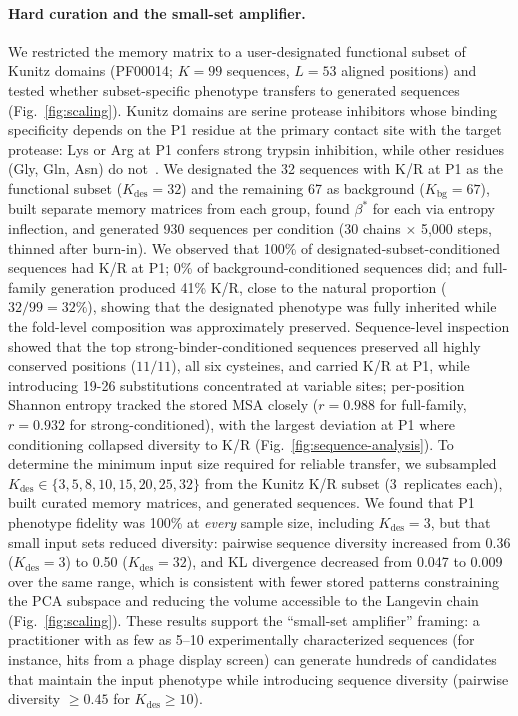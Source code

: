 \paragraph{Hard curation and the small-set amplifier.}
We restricted the memory matrix to a user-designated functional subset of Kunitz domains
(PF00014; $K=99$ sequences, $L=53$ aligned positions) and tested whether subset-specific
phenotype transfers to generated sequences (Fig.~\ref{fig:scaling}). Kunitz domains are serine protease inhibitors whose binding
specificity depends on the P1 residue at the primary contact site with the target protease: Lys
or Arg at P1 confers strong trypsin inhibition, while other residues (Gly, Gln, Asn) do
not~\cite{laskowskiProteinInhibitors1980}. We designated the 32 sequences with K/R at P1 as the
functional subset ($K_{\mathrm{des}} = 32$) and the remaining 67 as background
($K_{\mathrm{bg}} = 67$), built separate memory matrices from each group, found $\beta^{*}$
for each via entropy inflection, and generated 930 sequences per condition (30 chains $\times$
5{,}000 steps, thinned after burn-in). We observed that 100\% of
designated-subset-conditioned sequences had K/R at P1; 0\% of background-conditioned sequences
did; and full-family generation produced 41\% K/R, close to the natural proportion
($32/99 = 32\%$), showing that the designated phenotype was
fully inherited while the fold-level composition was approximately preserved.
Sequence-level inspection showed that the top strong-binder-conditioned sequences
preserved all highly conserved positions ($11/11$), all six cysteines, and carried K/R
at P1, while introducing 19-26 substitutions concentrated at variable sites;
per-position Shannon entropy tracked the stored MSA closely ($r = 0.988$ for full-family,
$r = 0.932$ for strong-conditioned), with the largest deviation at P1 where conditioning
collapsed diversity to K/R (Fig.~\ref{fig:sequence-analysis}).
To determine the minimum input size required for reliable transfer,
we subsampled $K_{\mathrm{des}} \in \{3, 5, 8, 10, 15, 20, 25, 32\}$ from the Kunitz K/R
subset (3~replicates each), built curated memory matrices, and generated sequences. We found
that P1 phenotype fidelity was 100\% at \emph{every} sample size, including
$K_{\mathrm{des}} = 3$, but that small input sets reduced diversity: pairwise sequence diversity
increased from 0.36 ($K_{\mathrm{des}} = 3$) to 0.50 ($K_{\mathrm{des}} = 32$), and KL
divergence decreased from 0.047 to 0.009 over the same range, which is consistent with fewer
stored patterns constraining the PCA subspace and reducing the volume accessible to the
Langevin chain (Fig.~\ref{fig:scaling}). These results support the ``small-set amplifier''
framing: a practitioner with as few as 5--10 experimentally characterized sequences (for
instance, hits from a phage display screen) can generate hundreds of candidates that
maintain the input phenotype while introducing sequence diversity (pairwise diversity
$\geq 0.45$ for $K_{\mathrm{des}} \geq 10$).

